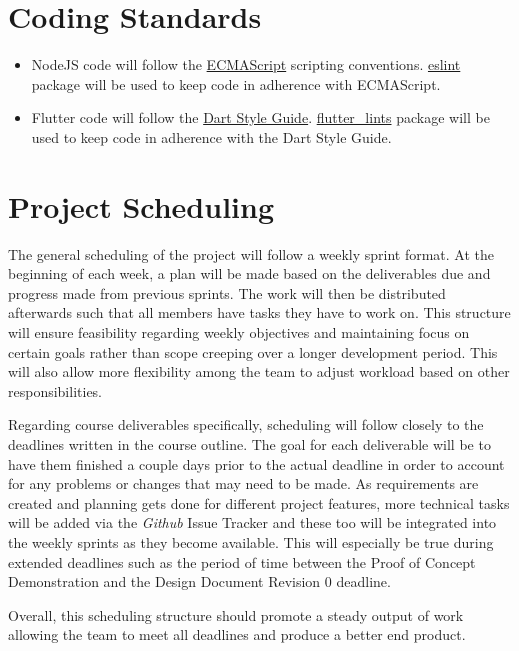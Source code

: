\documentclass{article}
\begin{document}
\section{Coding Standards}

\begin{itemize}
\item NodeJS code will follow the \href{https://www.ecma-international.org/publications-and-standards/standards/ecma-262/}{ECMAScript} scripting conventions. \href{https://www.npmjs.com/package/eslint}{eslint} package will be used to keep code in adherence with ECMAScript.
\item Flutter code will follow the \href{https://dart.dev/effective-dart/style}{Dart Style Guide}. \href{https://pub.dev/packages/flutter_lints}{flutter\_lints} package will be used to keep code in adherence with the Dart Style Guide.
\end{itemize}

\section{Project Scheduling}

The general scheduling of the project will follow a weekly sprint format. At the beginning
of each week, a plan will be made based on the deliverables due and progress made from previous sprints. The
work will then be distributed afterwards such that all members have tasks they have
to work on. This structure will ensure feasibility regarding weekly
objectives and maintaining focus on certain goals rather than scope creeping over
a longer development period. This will also allow more flexibility among the team to adjust workload
based on other responsibilities. \par

Regarding course deliverables specifically, scheduling will follow closely to the deadlines written in the
course outline. The goal for each deliverable will be to have them finished a couple days
prior to the actual deadline in order to account for any problems or changes that may
need to be made. As requirements are created and planning gets done for different project features,
more technical tasks will be added via the \emph{Github} Issue Tracker and these too will be
integrated into the weekly sprints as they become available. This will especially be true during
extended deadlines such as the period of time between the Proof of Concept Demonstration and
the Design Document Revision 0 deadline. \par

Overall, this scheduling structure should promote a steady output of work allowing the team
to meet all deadlines and produce a better end product.
\end{document}
